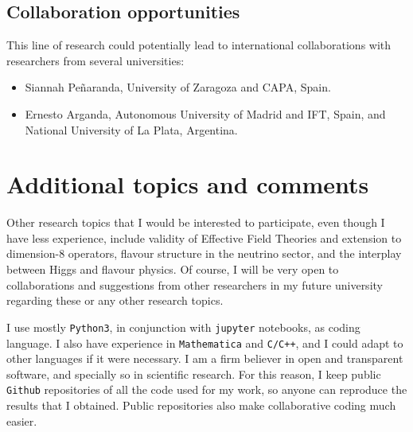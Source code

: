 \documentclass[combined.tex]{subfiles}
\begin{document}
\subsection{Collaboration opportunities}
This line of research could potentially lead to international collaborations with researchers from several universities:
\begin{itemize}
  \item Siannah Peñaranda, University of Zaragoza and CAPA, Spain.
  \item Ernesto Arganda, Autonomous University of Madrid and IFT, Spain, and National University of La Plata, Argentina.
\end{itemize}

\section{Additional topics and comments}
Other research topics that I would be interested to participate, even though I have less experience, include validity of Effective Field Theories and extension to dimension-8 operators, flavour structure in the neutrino sector, and the interplay between Higgs and flavour physics. Of course, I will be very open to collaborations and suggestions from other researchers in my future university regarding these or any other research topics.

I use mostly \texttt{Python3}, in conjunction with \texttt{jupyter} notebooks, as coding language. I also have experience in \texttt{Mathematica} and \texttt{C/C++}, and I could adapt to other languages if it were necessary. I am a firm believer in open and transparent software, and specially so in scientific research. For this reason, I keep public \texttt{Github} repositories of all the code used for my work, so anyone can reproduce the results that I obtained. Public repositories also make collaborative coding much easier.

\printbibliography[heading=bibintoc]
\end{document}
